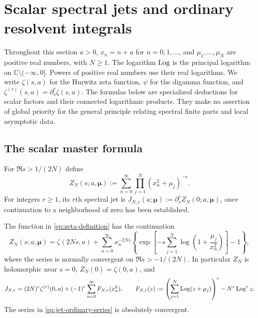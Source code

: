 \section{Scalar spectral jets and ordinary resolvent integrals}
\label{sp:section}

Throughout this section $a>0$, $x_n=n+a$ for $n=0,1,\ldots$, and
$\mu_1,\ldots,\mu_N$ are positive real numbers, with $N\geq1$.
The logarithm $\operatorname{Log}$ is the principal logarithm on
$\mathbb C\setminus(-\infty,0]$.  Powers of positive real numbers use
their real logarithms.  We write $\zeta(s,a)$ for the Hurwitz zeta
function, $\psi$ for the digamma function, and
$\zeta^{(r)}(s,a)=\partial_s^r\zeta(s,a)$.
The formulas below are specialized deductions for scalar factors and
their connected logarithmic products.  They make no assertion of
global priority for the general principle relating spectral finite
parts and local asymptotic data.

\subsection{The scalar master formula}
\label{sp:scalar-subsection}

For $\Re s>1/(2N)$ define
\begin{equation}
 Z_N(s;a,\boldsymbol\mu)
 :=\sum_{n=0}^{\infty}\prod_{j=1}^{N}(x_n^2+\mu_j)^{-s}.
 \label{sp:zeta-definition}
\end{equation}
For integers $r\geq1$, its $r$th spectral jet is
$J_{N,r}(a;\boldsymbol\mu):=\partial_s^rZ_N(0;a,\boldsymbol\mu)$,
once continuation to a neighborhood of zero has been established.

\begin{lemma}
\label{sp:continuation}
The function in \eqref{sp:zeta-definition} has the continuation
\begin{equation}
 Z_N(s;a,\boldsymbol\mu)
 =\zeta(2Ns,a)+
 \sum_{n=0}^{\infty}x_n^{-2Ns}
 \left\{\exp\left[-s\sum_{j=1}^{N}
             \log\left(1+\frac{\mu_j}{x_n^2}\right)\right]-1\right\},
 \label{sp:normal-continuation}
\end{equation}
where the series is normally convergent on $\Re s>-1/(2N)$.
In particular $Z_N$ is holomorphic near $s=0$, $Z_N(0)=\zeta(0,a)$,
and
\begin{equation}
 J_{N,r}=(2N)^r\zeta^{(r)}(0,a)
          +(-1)^r\sum_{n=0}^{\infty}F_{N,r}(x_n^2),
 \qquad
 F_{N,r}(z):=
 \left(\sum_{j=1}^{N}\operatorname{Log}(z+\mu_j)\right)^r-N^r\operatorname{Log}^r z.
 \label{sp:jet-ordinary-series}
\end{equation}
The series in \eqref{sp:jet-ordinary-series} is absolutely convergent.
\end{lemma}

